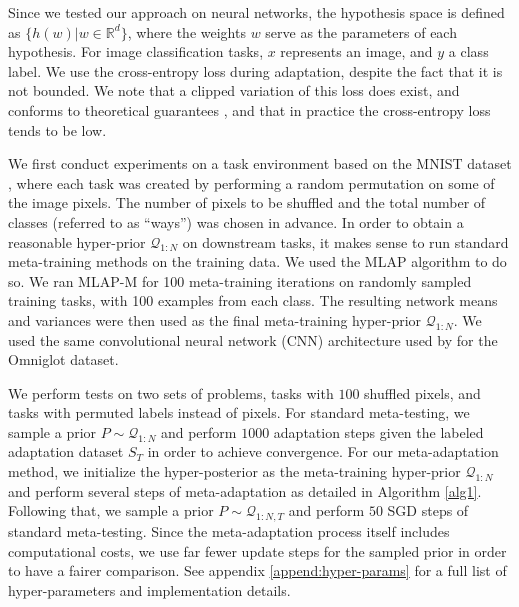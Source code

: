 \documentclass{article} %
\theoremstyle{definition}
\begin{document}
Since we tested our approach on neural networks, the hypothesis space is defined as $\{h(w)|w\in \mathbb{R}^d\}$, where the weights $w$ serve as the parameters of each hypothesis.
For image classification tasks, $x$ represents an image, and $y$ a class label. 
We use the cross-entropy loss during adaptation, despite the fact that it is not bounded. We note that a clipped variation of this loss does exist, and conforms to theoretical guarantees \citep{Dziugaite2018}, and that in practice the cross-entropy loss tends to be low. 

We first conduct experiments on a task environment based on the MNIST dataset \citep{LeCun1998}, where each task was created by performing a random permutation on some of the image pixels. The number of pixels to be shuffled and the total number of classes (referred to as ``ways'') was chosen in advance. In order to obtain a reasonable hyper-prior $\mathcal{Q}_{1:N}$ on downstream tasks, it makes sense to run standard meta-training methods on the training data.
We used the MLAP \citep{Amit2018} algorithm to do so. We ran MLAP-M for 100 meta-training iterations on randomly sampled training tasks, with 100 examples from each class. The resulting network means and variances were then used as the final meta-training hyper-prior $\mathcal{Q}_{1:N}$. We used the same convolutional neural network (CNN) architecture used by \citet{Vinyals2016} for the Omniglot dataset.

We perform tests on two sets of problems, tasks with $100$ shuffled pixels, and tasks with permuted labels instead of pixels.
For standard meta-testing, we sample a prior $P\sim \mathcal{Q}_{1:N}$ and perform $1000$ adaptation steps given the labeled adaptation dataset $S_T$ in order to achieve convergence. For our meta-adaptation method, we initialize the hyper-posterior as the meta-training hyper-prior $\mathcal{Q}_{1:N}$ and
 perform several steps of meta-adaptation as detailed in Algorithm \ref{alg1}. Following that, we sample a prior $P\sim \mathcal{Q}_{1:N,T}$ and perform  $50$ SGD steps of standard meta-testing. Since the meta-adaptation process itself includes computational costs, we use far fewer update steps for the sampled prior in order to have a fairer comparison.
See appendix \ref{append:hyper-params} for a full list of hyper-parameters and implementation details. %
\end{document}
